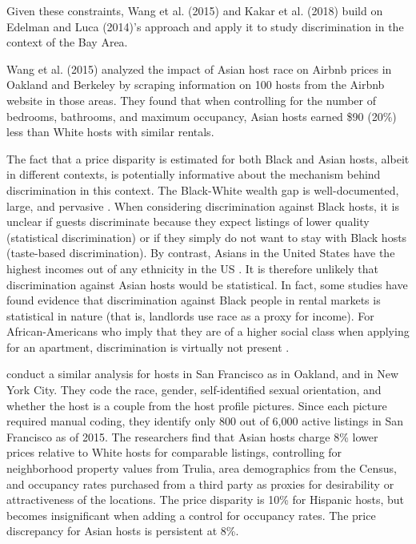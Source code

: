 Given these constraints, Wang et al. (2015) and Kakar et al. (2018) build on Edelman and Luca (2014)’s approach and apply it to study discrimination in the context of the Bay Area. 

Wang et al. (2015) analyzed the impact of Asian host race on Airbnb prices in Oakland and Berkeley by scraping information on 100 hosts from the Airbnb website in those areas. They found that when controlling for the number of bedrooms, bathrooms, and maximum occupancy, Asian hosts earned \$90 (20\%) less than White hosts with similar rentals. 

The fact that a price disparity is estimated for both Black and Asian hosts, albeit in different contexts, is potentially informative about the mechanism behind discrimination in this context. The Black-White wealth gap is well-documented, large, and pervasive \citep{cfed, heywood, bayard, mason, chiteji, altonji, gittleman}. When considering discrimination against Black hosts, it is unclear if guests discriminate because they expect listings of lower quality (statistical discrimination) or if they simply do not want to stay with Black hosts (taste-based discrimination). By contrast, Asians in the United States have the highest incomes out of any ethnicity in the US \citep{income}. It is therefore unlikely that discrimination against Asian hosts would be statistical. In fact, some studies have found evidence that discrimination against Black people in rental markets is statistical in nature (that is, landlords use race as a proxy for income). For African-Americans who imply that they are of a higher social class when applying for an apartment, discrimination is virtually not present \citep{hanson}.

\cite{kakar} conduct a similar analysis for hosts in San Francisco as \cite{wang} in Oakland, and \cite{edelman} in New York City. They code the race, gender, self-identified sexual orientation, and whether the host is a couple from the host profile pictures. Since each picture required manual coding, they identify only 800 out of 6,000 active listings in San Francisco as of 2015. The researchers find that Asian hosts charge 8\% lower prices relative to White hosts for comparable listings, controlling for neighborhood property values from Trulia, area demographics from the Census, and occupancy rates purchased from a third party as proxies for desirability or attractiveness of the locations. The price disparity is 10\% for Hispanic hosts, but becomes insignificant when adding a control for occupancy rates. The price discrepancy for Asian hosts is persistent at 8\%. 

